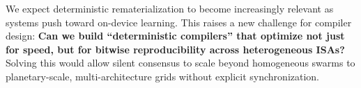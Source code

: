 \documentclass[conference]{IEEEtran}
\begin{document}
We expect deterministic rematerialization to become increasingly relevant as systems push toward on-device learning. This raises a new challenge for compiler design: \textbf{Can we build ``deterministic compilers'' that optimize not just for speed, but for bitwise reproducibility across heterogeneous ISAs?} Solving this would allow silent consensus to scale beyond homogeneous swarms to planetary-scale, multi-architecture grids without explicit synchronization.



\end{document}
